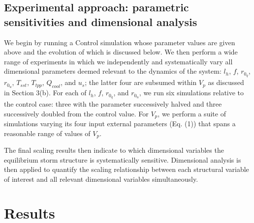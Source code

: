 \documentclass[12pt]{article}
\begin{document}
\subsection{Experimental approach: parametric sensitivities and dimensional analysis}
We begin by running a Control simulation whose parameter values are given above and the evolution of which is discussed below.  We then perform a wide range of experiments in which we independently and systematically vary all dimensional parameters deemed relevant to the dynamics of the system: $l_h$, $f$, $r_{0_q}$, $r_{0_u}$, $T_{sst}$, $T_{tpp}$, $Q_{cool}$, and $u_s$; the latter four are subsumed within $V_p$ as discussed in Section 3(b).  For each of $l_h$, $f$, $r_{0_q}$, and $r_{0_u}$, we run six simulations relative to the control case: three with the parameter successively halved and three successively doubled from the control value.  For $V_p$, we perform a suite of simulations varying its four input external parameters (Eq. (1)) that spans a reasonable range of values of $V_p$.

The final scaling results then indicate to which dimensional variables the equilibrium storm structure is systematically sensitive.  Dimensional analysis is then applied to quantify the scaling relationship between each structural variable of interest and all relevant dimensional variables simultaneously.

\section{Results}

\end{document}
